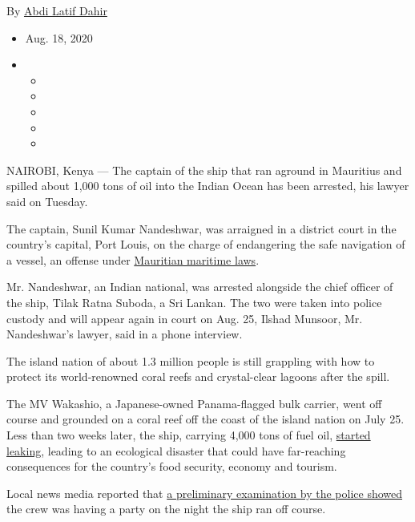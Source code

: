 By \href{https://www.nytimes3xbfgragh.onion/by/abdi-latif-dahir}{Abdi
Latif Dahir}

\begin{itemize}
\item
  Aug. 18, 2020
\item
  \begin{itemize}
  \item
  \item
  \item
  \item
  \item
  \end{itemize}
\end{itemize}

NAIROBI, Kenya --- The captain of the ship that ran aground in Mauritius
and spilled about 1,000 tons of oil into the Indian Ocean has been
arrested, his lawyer said on Tuesday.

The captain, Sunil Kumar Nandeshwar, was arraigned in a district court
in the country's capital, Port Louis, on the charge of endangering the
safe navigation of a vessel, an offense under
\href{http://blueconomy.govmu.org/English/Documents/THE\%20PIRACY\%20AND\%20MARITIME\%20VIOLENCE\%20ACT\%202011.pdf}{Mauritian
maritime laws}.

Mr. Nandeshwar, an Indian national, was arrested alongside the chief
officer of the ship, Tilak Ratna Suboda, a Sri Lankan. The two were
taken into police custody and will appear again in court on Aug. 25,
Ilshad Munsoor, Mr. Nandeshwar's lawyer, said in a phone interview.

The island nation of about 1.3 million people is still grappling with
how to protect its world-renowned coral reefs and crystal-clear lagoons
after the spill.

The MV Wakashio, a Japanese-owned Panama-flagged bulk carrier, went off
course and grounded on a coral reef off the coast of the island nation
on July 25. Less than two weeks later, the ship, carrying 4,000 tons of
fuel oil,
\href{https://www.nytimes3xbfgragh.onion/2020/08/07/world/africa/mauritius-oil-spill.html}{started
leaking}, leading to an ecological disaster that could have far-reaching
consequences for the country's food security, economy and tourism.

Local news media reported that
\href{https://www.lemauricien.com/actualites/faits-divers/enquete-sur-le-wakashio-lequipage-coule-le-capitaine-en-confirmant-son-absence-de-la-cabine/369098/}{a
preliminary examination by the police showed} the crew was having a
party on the night the ship ran off course.

